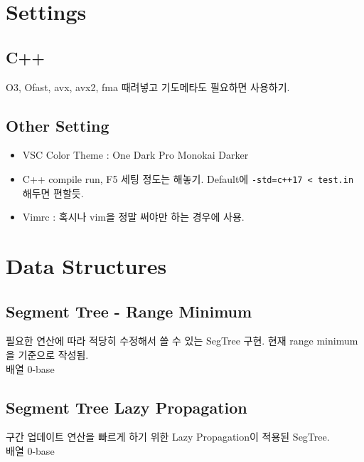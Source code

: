 \documentclass[landscape,8pt]{article}
\begin{document}
\newpage
\maketitle
\begin{multicols}{3}\raggedcolumns
\tableofcontents
\end{multicols}
\pagebreak
\begin{multicols}{2}\raggedcolumns
\section{Settings}
  \subsection{C++}
    O3, Ofast, avx, avx2, fma 때려넣고 기도메타도 필요하면 사용하기.
    
  \subsection{Other Setting}
    \begin{itemize}
      \item VSC Color Theme : One Dark Pro Monokai Darker
      \item C++ compile run, F5 세팅 정도는 해놓기. Default에 \texttt{-std=c++17 < test.in} 해두면 편할듯.
      \item Vimrc : 혹시나 vim을 정말 써야만 하는 경우에 사용.
      
    \end{itemize}
\section{Data Structures}
  \subsection{Segment Tree - Range Minimum}
     필요한 연산에 따라 적당히 수정해서 쓸 수 있는 SegTree 구현. 현재 range minimum을 기준으로 작성됨.\\
     배열 0-base
     

  \subsection{Segment Tree Lazy Propagation}
     구간 업데이트 연산을 빠르게 하기 위한 Lazy Propagation이 적용된 SegTree.\\
     배열 0-base
     

\end{multicols}
\end{document}
